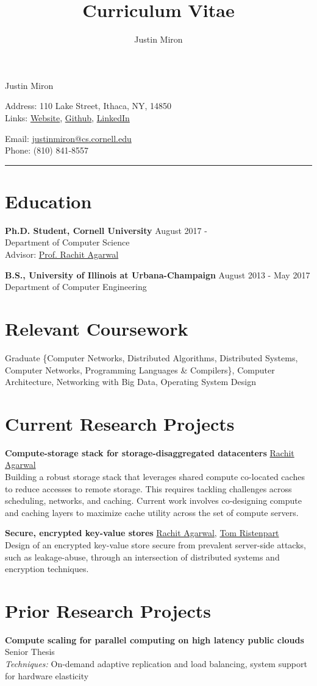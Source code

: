 \documentclass[10pt]{article}
\title{Curriculum Vitae}
\author{Justin Miron}
\makeatletter
\newcommand{\Hrule}{\par\rule{\linewidth}{0.3mm}}
\newcommand{\leftrightrow}[2]{
	#1 \hfill #2 \\
}
\newcommand{\titlesection}{
\parindent=0pt
\setlength{\parskip}{0.1em}

\par{\begin{center}\LARGE Justin Miron\end{center}}

\begin{minipage}[t]{0.40\textwidth}
Address: 110 Lake Street, Ithaca, NY, 14850 \\
Links: \href{http://justinmiron.com}{Website}, \href{https://github.com/jmiron11}{Github}, \href{https://www.linkedin.com/in/justinmiron/}{LinkedIn}
\end{minipage}
\hfill
\begin{minipage}[t]{0.40\textwidth}
Email: \href{mailto:justinmiron@cs.cornell.edu}{justinmiron@cs.cornell.edu} \\
Phone: (810) 841-8557
\end{minipage}
\vspace{0.3em}
\Hrule
}
\newcommand{\researchblock}[3]{
	\leftrightrow{\textbf{#1}}{#2}#3
}
\newcommand{\educationblock}[3]{
	\leftrightrow{\textbf{#1}}{#2}
    #3
}
\makeatother
\begin{document}
\titlesection
\setlength{\parskip}{0em}
\vspace{-2.5em}
\section{Education}
\vspace{0.1em}
\educationblock{Ph.D. Student, Cornell University}{August 2017 - }{Department of Computer Science \\
Advisor: \href{http://www.cs.cornell.edu/~ragarwal/}{Prof. Rachit Agarwal}}
\vspace{0.5em}

\educationblock{B.S., University of Illinois at Urbana-Champaign}{August 2013 - May 2017}{Department of Computer Engineering}

\section{Relevant Coursework}
\vspace{0.1em}
Graduate \{Computer Networks, Distributed Algorithms, Distributed Systems, Computer Networks, Programming Languages \& Compilers\}, Computer Architecture, Networking with Big Data, Operating System Design

\section{Current Research Projects}
\vspace{0.1em}
\researchblock{Compute-storage stack for storage-disaggregated datacenters}{\href{http://www.cs.cornell.edu/~ragarwal/}{Rachit Agarwal}}
{
	Building a robust storage stack that leverages shared compute co-located caches to reduce accesses to remote storage. This requires tackling challenges across scheduling, networks, and caching. Current work involves co-designing compute and caching layers to maximize cache utility across the set of compute servers.
}

\vspace{0.6em}

\researchblock{Secure, encrypted key-value stores}{\href{http://www.cs.cornell.edu/~ragarwal/}{Rachit Agarwal}, \href{https://rist.tech.cornell.edu/}{Tom Ristenpart}}
{
	Design of an encrypted key-value store secure from prevalent server-side attacks, such as leakage-abuse, through an intersection of distributed systems and encryption techniques.
}

\section{Prior Research Projects}
\vspace{0.1em}
\researchblock{Compute scaling for parallel computing on high latency public clouds}{Senior Thesis}
{
 	\textit{Techniques: } On-demand adaptive replication and load balancing, system support for hardware elasticity
}
\end{document}
